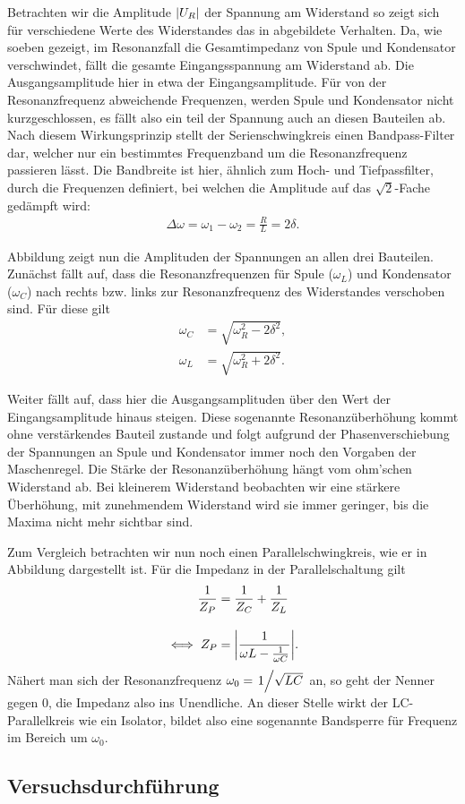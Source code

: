 Betrachten wir die Amplitude $\qty| U_R |$ der Spannung am Widerstand so zeigt sich für verschiedene Werte des Widerstandes das in  abgebildete Verhalten. Da, wie soeben gezeigt, im Resonanzfall die Gesamtimpedanz von Spule und Kondensator verschwindet, fällt die gesamte Eingangsspannung am Widerstand ab. Die Ausgangsamplitude hier in etwa der Eingangsamplitude. Für von der Resonanzfrequenz abweichende Frequenzen, werden Spule und Kondensator nicht kurzgeschlossen, es fällt also ein teil der Spannung auch an diesen Bauteilen ab. Nach diesem Wirkungsprinzip stellt der Serienschwingkreis einen Bandpass-Filter dar, welcher nur ein bestimmtes Frequenzband um die Resonanzfrequenz passieren lässt. Die Bandbreite ist hier, ähnlich zum Hoch- und Tiefpassfilter, durch die Frequenzen definiert, bei welchen die Amplitude auf das $\sqrt{2}$-Fache gedämpft wird:
\begin{align}
  \Delta \omega = \omega_1 - \omega_2 = \frac{R}{L} = 2\delta.
\end{align}

Abbildung  zeigt nun die Amplituden der Spannungen an allen drei Bauteilen. Zunächst fällt auf, dass die Resonanzfrequenzen für Spule ($\omega_L$) und Kondensator ($\omega_C$) nach rechts bzw. links zur Resonanzfrequenz des Widerstandes verschoben sind. Für diese gilt
\begin{align}
  \omega_C &= \sqrt{\omega_R^2 - 2\delta^2},\\
  \omega_L &= \sqrt{\omega_R^2 + 2\delta^2}.
\end{align}

Weiter fällt auf, dass hier die Ausgangsamplituden über den Wert der Eingangsamplitude hinaus steigen. Diese sogenannte Resonanzüberhöhung kommt ohne verstärkendes Bauteil zustande und folgt aufgrund der Phasenverschiebung der Spannungen an Spule und Kondensator immer noch den Vorgaben der Maschenregel. Die Stärke der Resonanzüberhöhung hängt vom ohm'schen Widerstand ab. Bei kleinerem Widerstand beobachten wir eine stärkere Überhöhung, mit zunehmendem Widerstand wird sie immer geringer, bis die Maxima nicht mehr sichtbar sind.

Zum Vergleich betrachten wir nun noch einen Parallelschwingkreis, wie er in Abbildung  dargestellt ist. Für die Impedanz in der Parallelschaltung gilt
\begin{align}
  \frac{1}{Z_P} &= \frac{1}{Z_C} + \frac{1}{Z_L}\\[1em]
  \iff Z_P &= \qty|\frac{1}{\omega L - \frac{1}{\omega C}}|.
\end{align}
Nähert man sich der Resonanzfrequenz $\omega_0 = \ffrac{1}{\sqrt{LC}}$ an, so geht der Nenner gegen 0, die Impedanz also ins Unendliche. An dieser Stelle wirkt der LC-Parallelkreis wie ein Isolator, bildet also eine sogenannte Bandsperre für Frequenz im Bereich um $\omega_0$.

\subsection{Versuchsdurchführung}